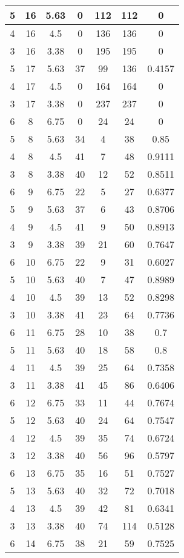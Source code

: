 \documentclass[letterpaper, 12pt]{article}
\begin{document}
\begin{longtable}{|c|c|c|c|c|c|c|}
\hline
5 & 16 & 5.63 & 0 & 112 & 112 & 0 \\
\hline
4 & 16 & 4.5 & 0 & 136 & 136 & 0 \\
\hline
3 & 16 & 3.38 & 0 & 195 & 195 & 0 \\
\hline
5 & 17 & 5.63 & 37 & 99 & 136 & 0.4157 \\
\hline
4 & 17 & 4.5 & 0 & 164 & 164 & 0 \\
\hline
3 & 17 & 3.38 & 0 & 237 & 237 & 0 \\
\hline
6 & 8 & 6.75 & 0 & 24 & 24 & 0 \\
\hline
5 & 8 & 5.63 & 34 & 4 & 38 & 0.85 \\
\hline
4 & 8 & 4.5 & 41 & 7 & 48 & 0.9111 \\
\hline
3 & 8 & 3.38 & 40 & 12 & 52 & 0.8511 \\
\hline
6 & 9 & 6.75 & 22 & 5 & 27 & 0.6377 \\
\hline
5 & 9 & 5.63 & 37 & 6 & 43 & 0.8706 \\
\hline
4 & 9 & 4.5 & 41 & 9 & 50 & 0.8913 \\
\hline
3 & 9 & 3.38 & 39 & 21 & 60 & 0.7647 \\
\hline
6 & 10 & 6.75 & 22 & 9 & 31 & 0.6027 \\
\hline
5 & 10 & 5.63 & 40 & 7 & 47 & 0.8989 \\
\hline
4 & 10 & 4.5 & 39 & 13 & 52 & 0.8298 \\
\hline
3 & 10 & 3.38 & 41 & 23 & 64 & 0.7736 \\
\hline
6 & 11 & 6.75 & 28 & 10 & 38 & 0.7 \\
\hline
5 & 11 & 5.63 & 40 & 18 & 58 & 0.8 \\
\hline
4 & 11 & 4.5 & 39 & 25 & 64 & 0.7358 \\
\hline
3 & 11 & 3.38 & 41 & 45 & 86 & 0.6406 \\
\hline
6 & 12 & 6.75 & 33 & 11 & 44 & 0.7674 \\
\hline
5 & 12 & 5.63 & 40 & 24 & 64 & 0.7547 \\
\hline
4 & 12 & 4.5 & 39 & 35 & 74 & 0.6724 \\
\hline
3 & 12 & 3.38 & 40 & 56 & 96 & 0.5797 \\
\hline
6 & 13 & 6.75 & 35 & 16 & 51 & 0.7527 \\
\hline
5 & 13 & 5.63 & 40 & 32 & 72 & 0.7018 \\
\hline
4 & 13 & 4.5 & 39 & 42 & 81 & 0.6341 \\
\hline
3 & 13 & 3.38 & 40 & 74 & 114 & 0.5128 \\
\hline
6 & 14 & 6.75 & 38 & 21 & 59 & 0.7525 \\

\end{longtable}
\end{document}
